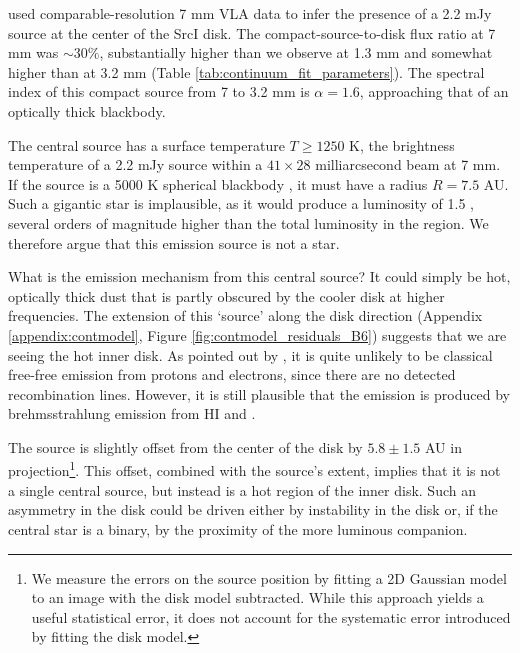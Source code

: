 \documentclass[twocolumn]{aastex62}
\newcommand{\sourcei}{SrcI\xspace}
\begin{document}
\citet{Reid2007a} used comparable-resolution 7 mm VLA data to infer
the presence of a 2.2 mJy source at the center of the \sourcei disk.
The compact-source-to-disk flux ratio at 7 mm was $\sim30\%$, substantially
higher than we observe at 1.3 mm and somewhat
higher than at 3.2 mm (Table \ref{tab:continuum_fit_parameters}).  
The spectral index of this compact source from 7 to 3.2 mm is $\alpha=1.6$,
approaching that of an optically
thick blackbody.

The central source has a surface temperature $T\geq1250$ K, the brightness
temperature of a 2.2 mJy source within a $41\times28$ milliarcsecond beam at 7
mm.  If the source is a 5000 K spherical blackbody \citep[e.g.,][]{Testi2010a},
it must have a radius $R=7.5$ AU.  Such a gigantic star is implausible, as it
would produce a luminosity of 1.5 \lsun, several orders of magnitude
higher than the total luminosity in the region.  We therefore argue
that this emission source is not a star.

What is the emission mechanism from this central source?
It could simply be hot, optically thick dust that is partly obscured by the
cooler disk at higher frequencies.  The  extension of this `source' along the
disk direction (Appendix \ref{appendix:contmodel}, Figure
\ref{fig:contmodel_residuals_B6}) suggests that we are
seeing the hot inner disk.  As pointed out by \citet{Plambeck2016a}, it is
quite unlikely to be classical free-free emission from protons
and electrons, since there are no detected
recombination lines.  However, it is still plausible that the emission is
produced by brehmsstrahlung emission from HI and \hh
\citep{Reid2007a,Baez-Rubio2018a}.

The source is slightly offset from the center of the disk by $5.8\pm1.5$ AU in
projection\footnote{We measure the errors on the source position by fitting a
2D Gaussian model to an image with the disk model subtracted.  While this approach
yields a useful statistical error, it does not account for the systematic error
introduced by fitting the disk model. }.  This offset,
combined with the source's extent, implies that it is
not a single central source, but
instead is a hot region of the inner disk.  Such an asymmetry in the disk could
be driven either by instability in the disk or, if the central star is a
binary, by the proximity of the more luminous companion.
\end{document}

